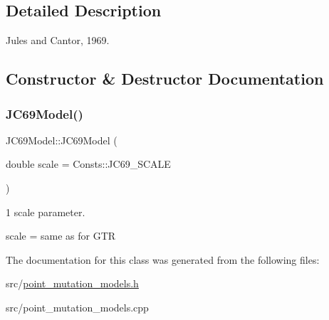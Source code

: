 \subsection{Detailed Description}
Jules and Cantor, 1969. 

\subsection{Constructor \& Destructor Documentation}
\mbox{\label{classrcombinator_1_1JC69Model_ab28021c22ed997738e2eac2f280930a5}} 
\subsubsection{\texorpdfstring{J\+C69\+Model()}{JC69Model()}}
{\footnotesize\ttfamily J\+C69\+Model\+::\+J\+C69\+Model (\begin{DoxyParamCaption}\item[{double}]{scale = {\ttfamily Consts\+:\+:JC69\+\_\+SCALE} }\end{DoxyParamCaption})}



1 scale parameter. 

scale = same as for G\+TR 

The documentation for this class was generated from the following files\+:\begin{DoxyCompactItemize}
\item 
src/\mbox{\hyperlink{point__mutation__models_8h}{point\+\_\+mutation\+\_\+models.\+h}}\item 
src/point\+\_\+mutation\+\_\+models.\+cpp\end{DoxyCompactItemize}
